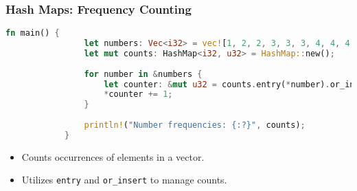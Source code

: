 \documentclass[aspectratio=169, table]{beamer}
\begin{document}
	\begin{frame}[fragile]
		\frametitle{Hash Maps: Frequency Counting}
		\begin{lstlisting}[language=Rust]
			fn main() {
				let numbers: Vec<i32> = vec![1, 2, 2, 3, 3, 3, 4, 4, 4, 4];
				let mut counts: HashMap<i32, u32> = HashMap::new();
				
				for number in &numbers {
					let counter: &mut u32 = counts.entry(*number).or_insert(0);
					*counter += 1;
				}
				
				println!("Number frequencies: {:?}", counts);
			}
		\end{lstlisting}
		\begin{itemize}
			\item Counts occurrences of elements in a vector.
			\item Utilizes \texttt{entry} and \texttt{or\_insert} to manage counts.
		\end{itemize}
	\end{frame}
	
\end{document}
